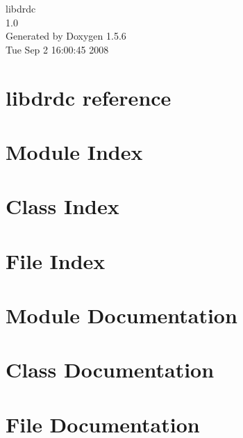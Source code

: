 \documentclass[a4paper]{book}
\begin{document}
\begin{titlepage}
\vspace*{7cm}
\begin{center}
{\Large libdrdc \\[1ex]\large 1.0 }\\
\vspace*{1cm}
{\large Generated by Doxygen 1.5.6}\\
\vspace*{0.5cm}
{\small Tue Sep 2 16:00:45 2008}\\
\end{center}
\end{titlepage}
\clearemptydoublepage
{}
\tableofcontents
\clearemptydoublepage
{}
\chapter{libdrdc reference}
\label{index}\hypertarget{index}{}
\chapter{Module Index}

\chapter{Class Index}

\chapter{File Index}

\chapter{Module Documentation}







\chapter{Class Documentation}





























\chapter{File Documentation}










\printindex
\end{document}
